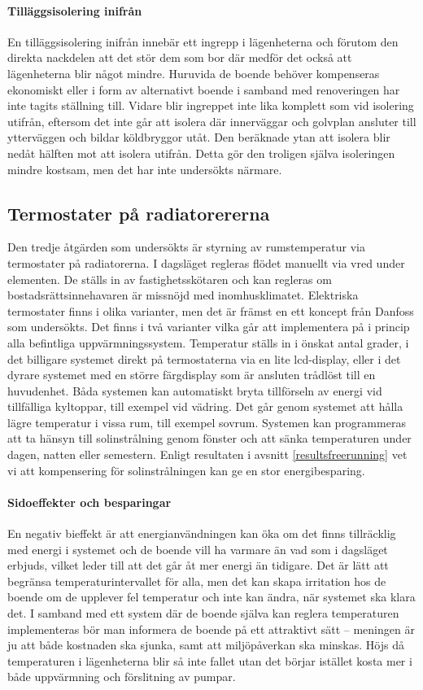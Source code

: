 \paragraph{Tilläggsisolering inifrån}
En tilläggsisolering inifrån innebär ett ingrepp i lägenheterna och förutom den direkta nackdelen att det stör dem som bor där medför det också att lägenheterna blir något mindre. Huruvida de boende behöver kompenseras ekonomiskt eller i form av alternativt boende i samband med renoveringen har inte tagits ställning till. Vidare blir ingreppet inte lika komplett som vid isolering utifrån, eftersom det inte går att isolera där innerväggar och golvplan ansluter till ytterväggen och bildar köldbryggor utåt. Den beräknade ytan att isolera blir nedåt hälften mot att isolera utifrån. Detta gör den troligen själva isoleringen mindre kostsam, men det har inte undersökts närmare.

\subsection{Termostater på radiatorererna}
Den tredje åtgärden som undersökts är styrning av rumstemperatur via termostater på radiatorerna. I dagsläget regleras flödet manuellt via vred under elementen. De ställs in av fastighetsskötaren och kan regleras om bostadsrättsinnehavaren är missnöjd med inomhusklimatet. Elektriska termostater finns i olika varianter, men det är främst en ett koncept från Danfoss som undersökts. Det finns i två varianter vilka går att implementera på i princip alla befintliga uppvärmningssystem. Temperatur ställs in i önskat antal grader, i det billigare systemet direkt på termostaterna via en lite lcd-display, eller i det dyrare systemet med en större färgdisplay som är ansluten trådlöst till en huvudenhet. Båda systemen kan automatiskt bryta tillförseln av energi vid tillfälliga kyltoppar, till exempel vid vädring. Det går genom systemet att hålla lägre temperatur i vissa rum, till exempel sovrum. Systemen kan programmeras att ta hänsyn till solinstrålning genom fönster och att sänka temperaturen under dagen, natten eller semestern. Enligt resultaten i avsnitt \ref{resultsfreerunning} vet vi att kompensering för solinstrålningen kan ge en stor energibesparing.

\paragraph{Sidoeffekter och besparingar}
En negativ bieffekt är att energianvändningen kan öka om det finns tillräcklig med energi i systemet och de boende vill ha varmare än vad som i dagsläget erbjuds, vilket leder till att det går åt mer energi än tidigare. Det är lätt att begränsa temperaturintervallet för alla, men det kan skapa irritation hos de boende om de upplever fel temperatur och inte kan ändra, när systemet ska klara det. I samband med ett system där de boende själva kan reglera temperaturen implementeras bör man informera de boende på ett attraktivt sätt – meningen är ju att både kostnaden ska sjunka, samt att miljöpåverkan ska minskas. Höjs då temperaturen i lägenheterna blir så inte fallet utan det börjar istället kosta mer i både uppvärmning och förslitning av pumpar. \cite{viivilla}

